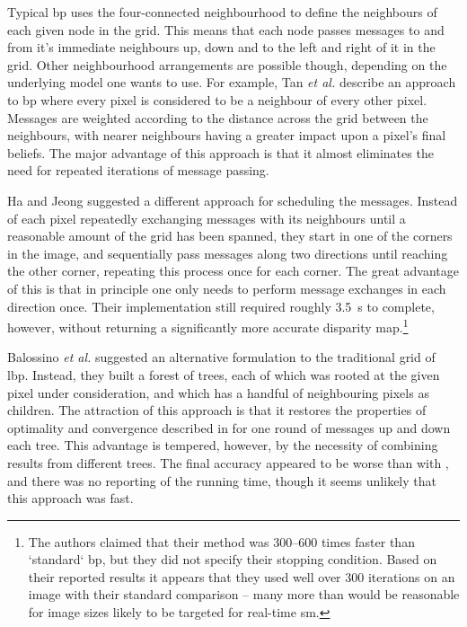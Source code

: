 Typical \gls{bp} uses the four-connected neighbourhood to define the neighbours of each given node in the grid.  This means that each node passes messages to and from it's immediate neighbours up, down and to the left and right of it in the grid.  Other neighbourhood arrangements are possible though, depending on the underlying model one wants to use.  For example, Tan \textit{et al.} \cite{Tan2017} describe an approach to \gls{bp} where every pixel is considered to be a neighbour of every other pixel.  Messages are weighted according to the distance across the grid between the neighbours, with nearer neighbours having a greater impact upon a pixel's final beliefs.  The major advantage of this approach is that it almost eliminates the need for repeated iterations of message passing.

Ha and Jeong \cite{Ha2016} suggested a different approach for scheduling the messages.  Instead of each pixel repeatedly exchanging messages with its neighbours until a reasonable amount of the grid has been spanned, they start in one of the corners in the image, and sequentially pass messages along two directions until reaching the other corner, repeating this process once for each corner.  The great advantage of this is that in principle one only needs to perform message exchanges in each direction once.  Their implementation still required roughly \SI{3.5}{\second} to complete, however, without returning a significantly more accurate disparity map.\footnote{The authors claimed that their method was \numrange{300}{600} times faster than `standard` \gls{bp}, but they did not specify their stopping condition.  Based on their reported results it appears that they used well over 300 iterations on an image with their standard comparison -- many more than would be reasonable for image sizes likely to be targeted for real-time \gls{sm}.}

Balossino \textit{et al.} \cite{Balossino2007} suggested an alternative formulation to the traditional grid of \gls{lbp}.  Instead, they built a forest of trees, each of which was rooted at the given pixel under consideration, and which has a handful of neighbouring pixels as children.  The attraction of this approach is that it restores the properties of optimality and convergence described in \cite{Pearl1982} for one round of messages up and down each tree.  This advantage is tempered, however, by the necessity of combining results from different trees.  The final accuracy appeared to be worse than with \cite{Felzenszwalb2006}, and there was no reporting of the running time, though it seems unlikely that this approach was fast.

